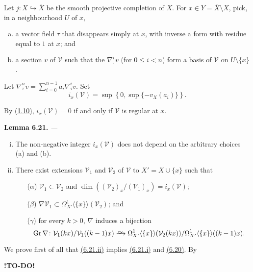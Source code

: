 \documentclass{report}
\newenvironment{itenv}[1]
  {\phantomsection\par\medskip\noindent\textbf{#1.}\itshape}
  {\par\medskip}
\renewcommand{\cal}[1]{{\mathcal{#1}}}
\newcommand{\simto}{\xrightarrow{\raisebox{-0.7ex}[0ex][0ex]{$\sim$}}}
\renewcommand{\leq}{\leqslant}
\DeclareMathOperator{\Gr}{Gr}
\newcommand{\todo}{\textbf{ !TO-DO! }}
\begin{document}
Let $j\colon X\hookrightarrow\overline{X}$ be the smooth projective completion of $X$.
For $x\in Y=\overline{X}\setminus X$, pick, in a neighbourhood $U$ of $x$,
\begin{enumerate}[(a)]
  \item a vector field $\tau$ that disappears simply at $x$, with inverse a form with residue equal to $1$ at $x$; and
  \item a section $v$ of $\cal{V}$ such that the $\nabla_\tau^i v$ (for $0\leq i<n$) form a basis of $\cal{V}$ on $U\setminus\{x\}$.
\end{enumerate}

Let $\nabla_\tau^n v=\sum_{i=0}^{n-1}a_i\nabla_\tau^i v$.
Set
\[
  i_x(\cal{V}) = \sup\left\{0,\sup\{-v_X(a_i)\}\right\}.
\]

By \hyperref[II.1.10]{(1.10)}, $i_x(\cal{V})=0$ if and only if $\cal{V}$ is regular at $x$.

\begin{itenv}{Lemma 6.21}
\label{II.6.21}
---
\begin{enumerate}[(i)]
  \item The non-negative integer $i_x(\cal{V})$ does not depend on the arbitrary choices (a) and (b).
  \item There exist extensions $\cal{V}_1$ and $\cal{V}_2$ of $\cal{V}$ to $X'=X\cup\{x\}$ such that
    \begin{enumerate}
      \item[($\alpha$)] $\cal{V}_1\subset\cal{V}_2$ and $\dim((\cal{V}_2)_x/(\cal{V}_1)_x)=i_x(\cal{V})$;
      \item[($\beta$)] $\nabla\cal{V}_1\subset\Omega_{X'}^1\langle\{x\}\rangle(\cal{V}_2)$; and
      \item[($\gamma$)] for every $k>0$, $\nabla$ induces a bijection
        \[
          \Gr\nabla\colon
          \cal{V}_1(kx)/\cal{V}_1((k-1)x)
          \simto \Omega_{X'}^1\langle\{x\}\rangle(\cal{V}_2(kx))/\Omega_{X'}^1\langle\{x\}\rangle((k-1)x).
        \]
    \end{enumerate}
\end{enumerate}
\end{itenv}

We prove first of all that \hyperref[II.6.21]{(6.21.ii)} implies \hyperref[II.6.21]{(6.21.i)} and \hyperref[II.6.20]{(6.20)}.
By








\todo
\end{document}
